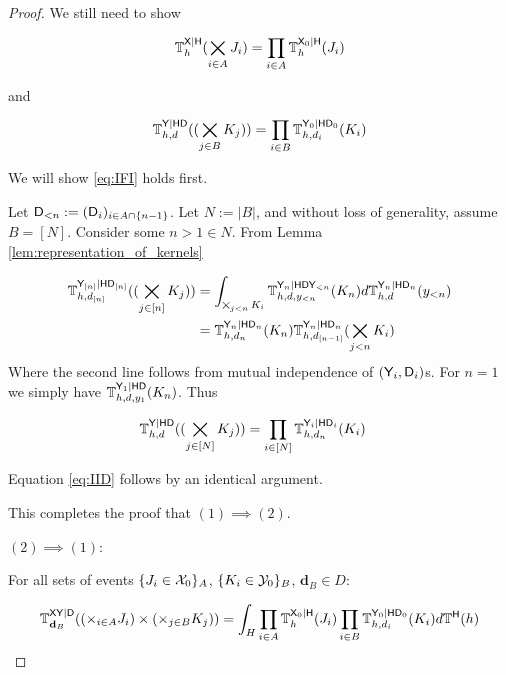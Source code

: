 \begin{proof}
We still need to show

\begin{align}
   \mathbb{T}^{\mathsf{X}|\mathsf{H}}_h(\bigtimes_{i\in A}J_i) = \prod_{i\in A} \mathbb{T}^{\mathsf{X}_0|\mathsf{H}}_h(J_i) \label{eq:IID}
\end{align}

and

\begin{align}
    \mathbb{T}_{h,d}^{\mathsf{Y}|\mathsf{H}\mathsf{D}}((\bigtimes_{j\in B} K_j)) = \prod_{i\in B}\mathbb{T}_{h,d_i}^{\mathsf{Y}_0|\mathsf{H}\mathsf{D}_0}(K_i)\label{eq:IFI}
\end{align}

We will show \ref{eq:IFI} holds first.

Let $\mathsf{D}_{<n}:=(\mathsf{D}_i)_{i\in A \cap\{n-1\}}$. Let $N:=|B|$, and without loss of generality, assume $B=[N]$. Consider some $n>1\in N$. From Lemma \ref{lem:representation_of_kernels}

\begin{align}
    \mathbb{T}_{h,d_{[n]}}^{\mathsf{Y}_{[n]}|\mathsf{H}\mathsf{D}_{[n]}}((\bigtimes_{j\in [n]} K_j)) &= \int_{\bigtimes_{j<n} K_{i}}\mathbb{T}_{h,d,y_{<n}}^{\mathsf{Y}_n|\mathsf{H}\mathsf{D}\mathsf{Y}_{<n}}(K_n)d\mathbb{T}_{h,d}^{\mathsf{Y}_n|\mathsf{H}\mathsf{D}_n}(y_{<n}) \\
     &= \mathbb{T}_{h,d_n}^{\mathsf{Y}_n|\mathsf{H}\mathsf{D}_n}(K_n)\mathbb{T}_{h,d_{[n-1]}}^{\mathsf{Y}_n|\mathsf{H}\mathsf{D}_n}(\bigtimes_{j<n} K_{i})
\end{align}
Where the second line follows from mutual independence of $(\mathsf{Y}_i,\mathsf{D}_i)$s. For $n=1$ we simply have $\mathbb{T}_{h,d,y_{1}}^{\mathsf{Y}_1|\mathsf{H}\mathsf{D}}(K_n)$. Thus

\begin{align}
    \mathbb{T}_{h,d}^{\mathsf{Y}|\mathsf{H}\mathsf{D}}((\bigtimes_{j\in [N]} K_j)) &= \prod_{i\in [N]}\mathbb{T}_{h,d_n}^{\mathsf{Y}_i|\mathsf{H}\mathsf{D}_i}(K_i)
\end{align}

Equation \ref{eq:IID} follows by an identical argument.

This completes the proof that $(1)\implies (2)$.

$(2)\implies (1)$:

For all sets of events $\{J_i\in \mathcal{X}_0\}_A$, $\{K_i\in \mathcal{Y}_0\}_B$, $\mathbf{d}_B\in D$:

\begin{align}
  \mathbb{T}^{\mathsf{X}\mathsf{Y}|\mathsf{D}}_{\mathbf{d}_B}((\times_{i\in A}J_i)\times (\times_{j\in B} K_j)) = \int_{H} \prod_{i\in A} \mathbb{T}^{\mathsf{X}_0|\mathsf{H}}_h(J_i)\prod_{i\in B}\mathbb{T}_{h,d_i}^{\mathsf{Y}_0|\mathsf{H}\mathsf{D}_0}(K_i)d\mathbb{T}^{\mathsf{H}}(h)
\end{align}


\end{proof}
